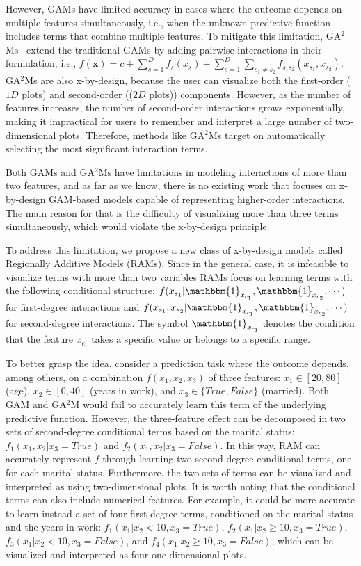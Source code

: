 \documentclass[12pt]{article}
\newcommand{\xb}{\mathbf{x}}
\newcommand{\when}[1]{\mathbbm{1}_{#1}}
\begin{document}
However, GAMs have limited accuracy in cases where the outcome depends on multiple features simultaneously,
i.e., when the unknown predictive function includes terms that combine multiple features.
To mitigate this limitation, GA$^2$Ms~\citep{lou2013accurate} extend the traditional GAMs by adding pairwise interactions in their
    formulation, i.e., \(f(\xb) = c + \sum_{s=1}^D f_s(x_s) + \sum_{s=1}^D \sum_{s_1 \neq s_2} f_{s_1 s_2}(x_{s_1}, x_{s_2})\).
GA$^2$Ms are also x-by-design, because the user can visualize both the first-order ($1D$ plots) and
second-order (($2D$ plots)) components.
However, as the number of features increases, the number of second-order interactions grows exponentially,
making it impractical for users to remember and interpret a large number of two-dimensional plots.
Therefore, methods like GA$^2$Ms target on automatically selecting the most significant interaction terms.

Both GAMs and GA$^2$Ms have limitations in modeling interactions of more than two features,
and as far as we know, there is no existing work that focuses on x-by-design GAM-based models capable of
representing higher-order interactions.
The main reason for that is the difficulty of visualizing more than three terms simultaneously,
which would violate the x-by-design principle.

To address this limitation, we propose a new class of x-by-design models called Regionally Additive Models (RAMs).
Since in the general case, it is infeasible to visualize terms with more than two variables
RAMs focus on learning terms with the following conditional structure:
$f(x_{s_1} | \when{x_{c_1}}, \when{x_{c_2}}, \cdots)$ for first-degree interactions and
$f(x_{s_1}, x_{s_2} | \when{x_{c_1}}, \when{x_{c_2}}, \cdots)$ for second-degree interactions.
The symbol $\when{x_{c_1}}$ denotes the condition that the feature $x_{c_1}$ takes a specific value or belongs to a specific range.

To better grasp the idea, consider a prediction task where the outcome depends, among others,
on a combination $f(x_1, x_2, x_3)$ of three features:
$x_1 \in [20, 80]$ (age), $x_2 \in [0, 40]$ (years in work), and $x_3 \in \{True, False\}$ (married).
Both GAM and GA$^2$M would fail to accurately learn this term of the underlying predictive function.
However, the three-feature effect can be decomposed in two sets of second-degree conditional terms based
on the marital status: $f_{1}(x_1, x_2 | x_3 = True)$ and $f_{2}(x_1, x_2 | x_3 = False)$.
In this way, RAM can accurately represent $f$ through learning two second-degree conditional terms, one for each marital status.
Furthermore, the two sets of terms can be visualized and interpreted as using two-dimensional plots.
It is worth noting that the conditional terms can also include numerical features.
For example, it could be more accurate to learn instead a set of four first-degree terms, conditioned on the marital status and the years in work:
$f_{1}(x_1 | x_2 < 10, x_3 = True)$,
$f_{2}(x_1 | x_2 \geq 10, x_3 = True)$,
$f_{3}(x_1 | x_2 < 10, x_3 = False)$, and
$f_{4}(x_1 | x_2 \geq 10, x_3 = False)$, which can be visualized and interpreted as four one-dimensional plots.
\end{document}
